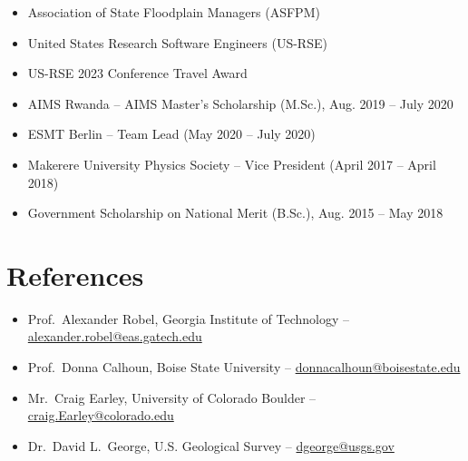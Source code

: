 \documentclass[11pt]{article}
\newcommand{\emaillink}[1]{%
\href{mailto:#1}{#1}%
}
\begin{document}
\begin{itemize}[leftmargin=1.2em, itemsep=2pt, topsep=2pt]
\item Association of State Floodplain Managers (ASFPM)

\item United States Research Software Engineers (US-RSE)

\item US-RSE 2023 Conference Travel Award

\item AIMS Rwanda -- AIMS Master's Scholarship (M.Sc.), Aug. 2019 -- July 2020

\item ESMT Berlin -- Team Lead (May 2020 -- July 2020)

\item Makerere University Physics Society -- Vice President (April 2017 -- April 2018)

\item Government Scholarship on National Merit (B.Sc.), Aug. 2015 -- May 2018

\end{itemize}

\section*{References}

\begin{itemize}[leftmargin=1.2em, itemsep=3pt, topsep=2pt]

\item Prof.\ Alexander Robel,
Georgia Institute of Technology --
\emaillink{alexander.robel@eas.gatech.edu}

\item Prof.\ Donna Calhoun,
Boise State University --
\emaillink{donnacalhoun@boisestate.edu}

\item Mr.\ Craig Earley,
University of Colorado Boulder --
\emaillink{craig.Earley@colorado.edu}

\item Dr.\ David L.\ George,
U.S. Geological Survey --
\emaillink{dgeorge@usgs.gov}

\end{itemize}
\end{document}
